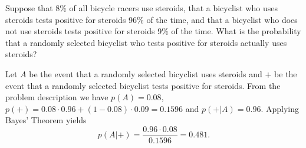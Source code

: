 \documentclass[../main.tex]{subfiles}
\begin{document}
Suppose that 8\% of all bicycle racers use steroids, that a bicyclist who uses steroids tests positive for steroids 96\% of the time, and that a bicyclist who does not use steroids tests positive for steroids 9\% of the time.
What is the probability that a randomly selected bicyclist who tests positive for steroids actually uses steroids?

\solution

Let $A$ be the event that a randomly selected bicyclist uses steroids and $+$ be the event that a randomly selected bicyclist tests positive for steroids.
From the problem description we have $p(A) = 0.08$, $p(+) = 0.08\cdot 0.96 + (1-0.08)\cdot 0.09 = 0.1596$ and $p(+|A) = 0.96$.
Applying Bayes' Theorem yields
\[ p(A|+) = \frac{0.96 \cdot 0.08}{0.1596} = 0.481. \]
\end{document}
